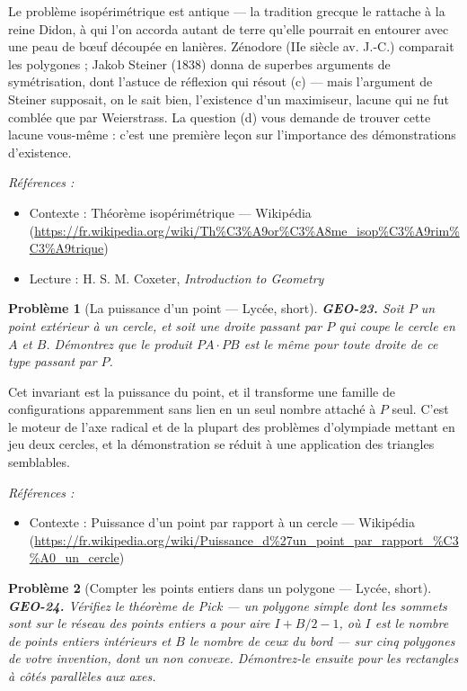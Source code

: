 \documentclass[11pt]{article}
\newtheorem{problem}{Problème}
\newenvironment{refs}{\par\small\noindent\emph{Références :}\begin{itemize}\setlength\itemsep{0pt}}{\end{itemize}\normalsize}
\begin{document}
\noindent Le problème isopérimétrique est antique --- la tradition grecque le rattache
à la reine Didon, à qui l'on accorda autant de terre qu'elle pourrait en entourer avec une
peau de b\oe{}uf découpée en lanières. Zénodore (IIe siècle av. J.-C.) comparait les
polygones ; Jakob Steiner (1838) donna de superbes arguments de symétrisation, dont l'astuce
de réflexion qui résout (c) --- mais l'argument de Steiner supposait, on le sait bien, l'existence
d'un maximiseur, lacune qui ne fut comblée que par Weierstrass. La question (d) vous demande de
trouver cette lacune vous-même : c'est une première leçon sur l'importance des démonstrations
d'existence.

\begin{refs}
\item Contexte : Théorème isopérimétrique --- Wikipédia (\url{https://fr.wikipedia.org/wiki/Th%C3%A9or%C3%A8me_isop%C3%A9rim%C3%A9trique})
\item Lecture : H. S. M. Coxeter, \textit{Introduction to Geometry}
\end{refs}

\bigskip

\begin{problem}[{La puissance d'un point --- Lycée, short}]
\textbf{GEO-23.} Soit $ P $ un point extérieur à un cercle, et soit une droite passant par $ P $ qui coupe le cercle en $ A $ et $ B $. Démontrez que le produit $ PA \cdot PB $ est le même pour toute droite de ce type passant par $ P $.
\end{problem}

\noindent Cet invariant est la puissance du point, et il transforme une famille de configurations apparemment sans lien en un seul nombre attaché à $ P $ seul. C'est le moteur de l'axe radical et de la plupart des problèmes d'olympiade mettant en jeu deux cercles, et la démonstration se réduit à une application des triangles semblables.

\begin{refs}
\item Contexte : Puissance d'un point par rapport à un cercle --- Wikipédia (\url{https://fr.wikipedia.org/wiki/Puissance_d%27un_point_par_rapport_%C3%A0_un_cercle})
\end{refs}

\bigskip

\begin{problem}[{Compter les points entiers dans un polygone --- Lycée, short}]
\textbf{GEO-24.} Vérifiez le théorème de Pick --- un polygone simple dont les sommets sont sur le réseau des points entiers a pour aire $ I + B/2 - 1 $, où $ I $ est le nombre de points entiers intérieurs et $ B $ le nombre de ceux du bord --- sur cinq polygones de votre invention, dont un non convexe. Démontrez-le ensuite pour les rectangles à côtés parallèles aux axes.
\end{problem}
\end{document}
